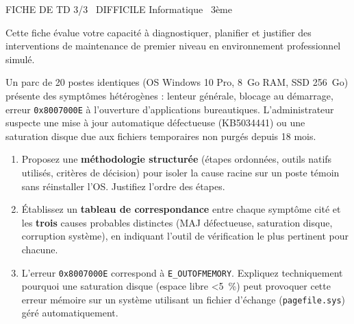 \documentclass[11pt]{article}
\begin{document}
\begin{tcolorbox}[enhanced,colback=popink,colframe=popink,arc=10pt,boxrule=0pt,left=12pt,right=12pt,top=9pt,bottom=9pt]
{\color{white}\popxbold\small FICHE DE TD 3/3 \textbullet\ DIFFICILE \hfill Informatique \textbullet\ 3ème\par}
\end{tcolorbox}
\vspace{4pt}
Cette fiche évalue votre capacité à diagnostiquer, planifier et justifier des interventions de maintenance de premier niveau en environnement professionnel simulé.

\begin{exercice}
Un parc de \num{20} postes identiques (OS Windows 10 Pro, \SI{8}{Go} RAM, SSD \SI{256}{Go}) présente des symptômes hétérogènes : \og lenteur générale\fg{}, \og blocage au démarrage\fg{}, \og erreur \texttt{0x8007000E} à l'ouverture d'applications bureautiques\fg{}. L'administrateur suspecte une mise à jour automatique défectueuse (KB5034441) ou une saturation disque due aux fichiers temporaires non purgés depuis \num{18} mois.
\begin{enumerate}
    \item Proposez une \textbf{méthodologie structurée} (étapes ordonnées, outils natifs utilisés, critères de décision) pour isoler la cause racine sur un poste témoin sans réinstaller l'OS. Justifiez l'ordre des étapes.
    \item Établissez un \textbf{tableau de correspondance} entre chaque symptôme cité et les \textbf{trois} causes probables distinctes (MAJ défectueuse, saturation disque, corruption système), en indiquant l'outil de vérification le plus pertinent pour chacune.
    \item L'erreur \texttt{0x8007000E} correspond à \texttt{E\_OUTOFMEMORY}. Expliquez techniquement pourquoi une saturation disque (espace libre \textless \SI{5}{\%}) peut provoquer cette erreur mémoire sur un système utilisant un fichier d'échange (\texttt{pagefile.sys}) géré automatiquement.
\end{enumerate}
\end{exercice}
\end{document}
